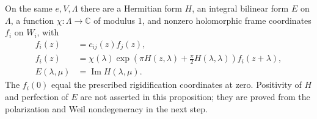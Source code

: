 \begin{srproposition}
\label{prop:ftb-actual-appell-humbert-frame}
On the same \(e,V,\Lambda\) there are a Hermitian form \(H\), an
integral bilinear form \(E\) on \(\Lambda\), a function
\(\chi:\Lambda\to\mathbb C\) of modulus \(1\), and nonzero holomorphic
frame coordinates \(f_i\) on \(W_i\), with
\[
 \begin{split}
 f_i(z)&=c_{ij}(z)f_j(z),\\
 f_i(z)&=\chi(\lambda)
       \exp\!\left(\pi H(z,\lambda)+\tfrac{\pi}{2}H(\lambda,\lambda)\right)
       f_i(z+\lambda),\\
 E(\lambda,\mu)&=\operatorname{Im}H(\lambda,\mu).
 \end{split}
 \tag{CF9}
\]
The \(f_i(0)\) equal the prescribed rigidification coordinates at
zero.  Positivity of \(H\) and perfection of \(E\) are not asserted in
this proposition; they are proved from the polarization and Weil
nondegeneracy in the next step.
\end{srproposition}

